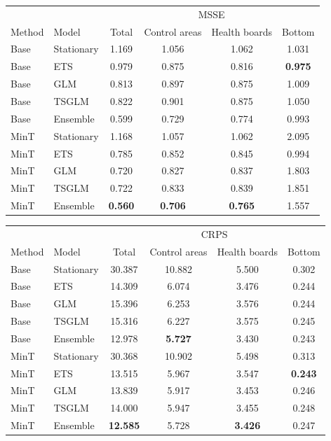 \documentclass[
  authoryear,
  preprint,
  3p]{elsarticle}
\begin{document}
\begin{table}
\begin{minipage}[t]{\linewidth}
{\centering
\begin{tabular}[t]{llcccc}
\toprule
\multicolumn{2}{c}{ } & \multicolumn{4}{c}{MSSE} \\
\cmidrule(l{3pt}r{3pt}){3-6}
Method & Model & Total & Control areas & Health boards & Bottom\\
\midrule
Base & Stationary & 1.169 & 1.056 & 1.062 & 1.031\\
Base & ETS & 0.979 & 0.875 & 0.816 & \textbf{0.975}\\
Base & GLM & 0.813 & 0.897 & 0.875 & 1.009\\
Base & TSGLM & 0.822 & 0.901 & 0.875 & 1.050\\
Base & Ensemble & 0.599 & 0.729 & 0.774 & 0.993\\
\addlinespace
MinT & Stationary & 1.168 & 1.057 & 1.062 & 2.095\\
MinT & ETS & 0.785 & 0.852 & 0.845 & 0.994\\
MinT & GLM & 0.720 & 0.827 & 0.837 & 1.803\\
MinT & TSGLM & 0.722 & 0.833 & 0.839 & 1.851\\
MinT & Ensemble & \textbf{0.560} & \textbf{0.706} & \textbf{0.765} & 1.557\\
\bottomrule
\end{tabular}

}

\end{minipage}%
\newline
\begin{minipage}[t]{\linewidth}

{\centering 

\tabularnewline

\centering
\begin{tabular}[t]{llcccc}
\toprule
\multicolumn{2}{c}{ } & \multicolumn{4}{c}{CRPS} \\
\cmidrule(l{3pt}r{3pt}){3-6}
Method & Model & Total & Control areas & Health boards & Bottom\\
\midrule
Base & Stationary & 30.387 & 10.882 & 5.500 & 0.302\\
Base & ETS & 14.309 & 6.074 & 3.476 & 0.244\\
Base & GLM & 15.396 & 6.253 & 3.576 & 0.244\\
Base & TSGLM & 15.316 & 6.227 & 3.575 & 0.245\\
Base & Ensemble & 12.978 & \textbf{5.727} & 3.430 & 0.243\\
\addlinespace
MinT & Stationary & 30.368 & 10.902 & 5.498 & 0.313\\
MinT & ETS & 13.515 & 5.967 & 3.547 & \textbf{0.243}\\
MinT & GLM & 13.839 & 5.917 & 3.453 & 0.246\\
MinT & TSGLM & 14.000 & 5.947 & 3.455 & 0.248\\
MinT & Ensemble & \textbf{12.585} & 5.728 & \textbf{3.426} & 0.247\\
\bottomrule
\end{tabular}

}
\end{minipage}
\end{table}
\end{document}

